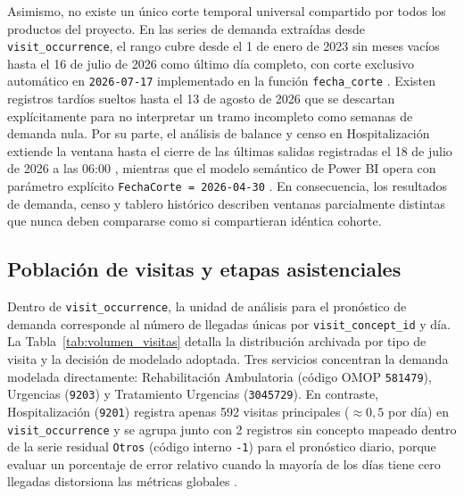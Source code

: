 Asimismo, no existe un único corte temporal universal compartido por todos los productos del proyecto. En las series de demanda extraídas desde \texttt{visit\_occurrence}, el rango cubre desde el 1 de enero de 2023 sin meses vacíos hasta el 16 de julio de 2026 como último día completo, con corte exclusivo automático en \texttt{2026-07-17} implementado en la función \texttt{fecha\_corte} \parencite{mediflow2026inventario,mediflow2026bundle}. Existen registros tardíos sueltos hasta el 13 de agosto de 2026 que se descartan explícitamente para no interpretar un tramo incompleto como semanas de demanda nula. Por su parte, el análisis de balance y censo en Hospitalización extiende la ventana hasta el cierre de las últimas salidas registradas el 18 de julio de 2026 a las 06:00 \parencite{mediflow2026informe}, mientras que el modelo semántico de Power BI opera con parámetro explícito \texttt{FechaCorte = 2026-04-30} \parencite{mediflow2026pbip}. En consecuencia, los resultados de demanda, censo y tablero histórico describen ventanas parcialmente distintas que nunca deben compararse como si compartieran idéntica cohorte.

\subsection{Población de visitas y etapas asistenciales}

Dentro de \texttt{visit\_occurrence}, la unidad de análisis para el pronóstico de demanda corresponde al número de llegadas únicas por \texttt{visit\_concept\_id} y día. La Tabla~\ref{tab:volumen_visitas} detalla la distribución archivada por tipo de visita y la decisión de modelado adoptada. Tres servicios concentran la demanda modelada directamente: Rehabilitación Ambulatoria (código OMOP \texttt{581479}), Urgencias (\texttt{9203}) y Tratamiento Urgencias (\texttt{3045729}). En contraste, Hospitalización (\texttt{9201}) registra apenas 592 visitas principales ($\approx 0{,}5$ por día) en \texttt{visit\_occurrence} y se agrupa junto con 2 registros sin concepto mapeado dentro de la serie residual \texttt{Otros} (código interno \texttt{-1}) para el pronóstico diario, porque evaluar un porcentaje de error relativo cuando la mayoría de los días tiene cero llegadas distorsiona las métricas globales \parencite{mediflow2026inventario}.

